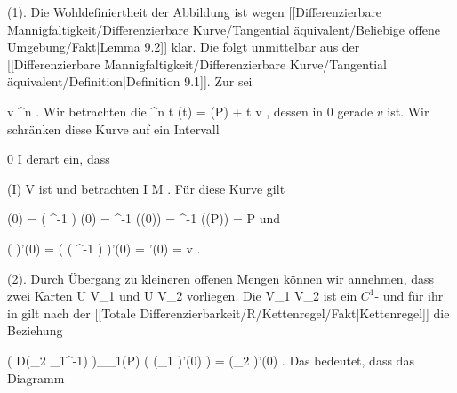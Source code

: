 {

\teilbeweis {}{}{}
{(1). Die Wohldefiniertheit der Abbildung ist wegen
[[Differenzierbare Mannigfaltigkeit/Differenzierbare Kurve/Tangential äquivalent/Beliebige offene Umgebung/Fakt|Lemma 9.2]]
klar. Die
folgt unmittelbar aus der
[[Differenzierbare Mannigfaltigkeit/Differenzierbare Kurve/Tangential äquivalent/Definition|Definition 9.1]].
Zur
sei

\mavergleichskette
{\vergleichskette
{ v
}
{ \in }{ \R^n
}
{  }{
}
{    }{
}
{   }{
}
}
{}{}{.}
Wir betrachten die
\maabbeledisp {\theta} { \R } { \R^n
} { t } { \theta(t) =  \alpha(P) + t v
} {,}
dessen
in $0$ gerade $v$ ist. Wir schränken diese Kurve auf ein Intervall

\mavergleichskette
{\vergleichskette
{ 0
}
{ \in }{ I
}
{ \subseteq }{ \R
}
{    }{
}
{   }{
}
}
{}{}{}
derart ein, dass

\mavergleichskette
{\vergleichskette
{ \theta(I)
}
{ \subseteq }{ V
}
{  }{
}
{    }{
}
{   }{
}
}
{}{}{}
ist und betrachten
 { I } { M
} {.}
Für diese Kurve gilt

\mavergleichskettedisp
{\vergleichskette
{ \gamma(0)
}
{ =} { \left(  \alpha^{-1} \circ \theta  \right) (0)
}
{ =} { \alpha^{-1} (\theta(0))
}
{ =} { \alpha^{-1} (\alpha(P))
}
{ =} { P
}
}
{}{}{}
und

\mavergleichskettedisp
{\vergleichskette
{ \left(  \alpha \circ \gamma  \right)'(0)
}
{ =} { \left(  \alpha \circ \left(  \alpha^{-1} \circ \theta  \right)  \right)'(0)
}
{ =} { \theta'(0)
}
{ =} { v
}
{ } {
}
}
{}{}{.}}
{}
\teilbeweis {}{}{}
{(2). Durch Übergang zu kleineren offenen Mengen können wir annehmen, dass zwei Karten
 { U } { V_1
} {}
und
 { U } { V_2
} {}
vorliegen. Die
 { V_1 } { V_2
} {}
ist ein
$C^1$-
und für ihr
in
 gilt nach
der [[Totale Differenzierbarkeit/R/Kettenregel/Fakt|Kettenregel]]
die Beziehung

\mavergleichskettedisp
{\vergleichskette
{ \left(  D(\alpha_2 \circ \alpha_1^{-1})  \right)_{\alpha_1(P)} \left(   (\alpha_1 \circ \gamma)'(0)   \right)
}
{ =} { (\alpha_2 \circ \gamma)'(0)
}
{ } {
}
{ } {
}
{ } {
}
}
{}{}{.}
Das bedeutet, dass das Diagramm

}}
